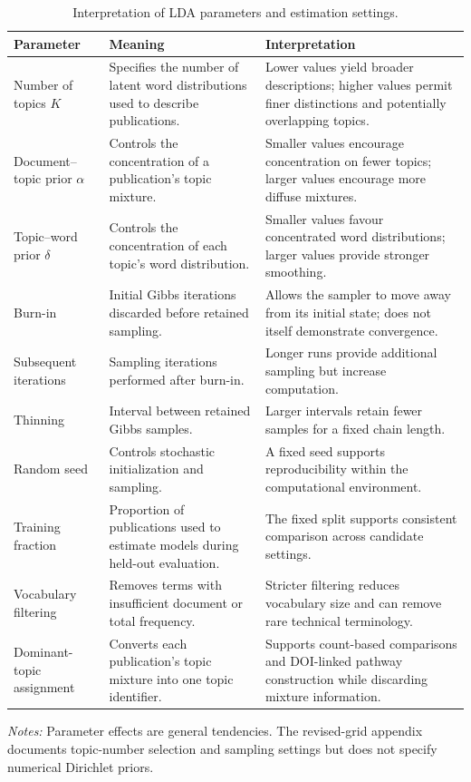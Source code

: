 \documentclass[a4paper,fleqn]{cas-sc}
\begin{document}
\begin{table}[htbp]
\centering
\caption{Interpretation of LDA parameters and estimation settings.}
\label{tab:opf_lda_parameter_interpretation}
\scriptsize
\setlength{\tabcolsep}{4pt}
\renewcommand{\arraystretch}{1.15}
\begin{tabularx}{\textwidth}{p{31mm}X p{43mm}}
\toprule
Parameter & Meaning & Interpretation \\
\midrule
Number of topics $K$ & Specifies the number of latent word distributions used to describe publications. & Lower values yield broader descriptions; higher values permit finer distinctions and potentially overlapping topics. \\
Document--topic prior $\alpha$ & Controls the concentration of a publication's topic mixture. & Smaller values encourage concentration on fewer topics; larger values encourage more diffuse mixtures. \\
Topic--word prior $\delta$ & Controls the concentration of each topic's word distribution. & Smaller values favour concentrated word distributions; larger values provide stronger smoothing. \\
Burn-in & Initial Gibbs iterations discarded before retained sampling. & Allows the sampler to move away from its initial state; does not itself demonstrate convergence. \\
Subsequent iterations & Sampling iterations performed after burn-in. & Longer runs provide additional sampling but increase computation. \\
Thinning & Interval between retained Gibbs samples. & Larger intervals retain fewer samples for a fixed chain length. \\
Random seed & Controls stochastic initialization and sampling. & A fixed seed supports reproducibility within the computational environment. \\
Training fraction & Proportion of publications used to estimate models during held-out evaluation. & The fixed split supports consistent comparison across candidate settings. \\
Vocabulary filtering & Removes terms with insufficient document or total frequency. & Stricter filtering reduces vocabulary size and can remove rare technical terminology. \\
Dominant-topic assignment & Converts each publication's topic mixture into one topic identifier. & Supports count-based comparisons and DOI-linked pathway construction while discarding mixture information. \\
\bottomrule
\end{tabularx}
\vspace{2mm}
\begin{minipage}{\textwidth}
\footnotesize
\textit{Notes:} Parameter effects are general tendencies. The revised-grid appendix documents topic-number selection and sampling settings but does not specify numerical Dirichlet priors.
\end{minipage}
\end{table}
\end{document}
